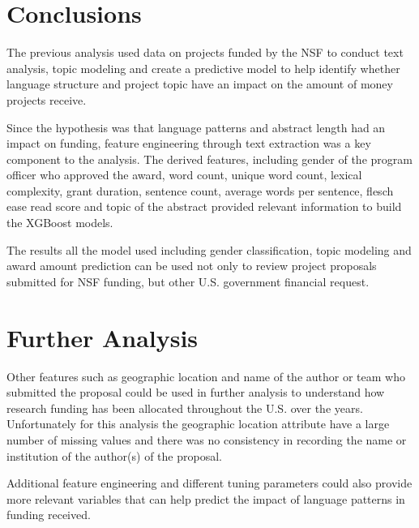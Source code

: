 \documentclass[11pt, oneside]{article}   	%
\begin{document}
 \section{Conclusions} 
 
The previous analysis used data on projects funded by the NSF to conduct text analysis, topic modeling and create a predictive model to help identify whether language structure and project topic have an impact on the amount of money projects receive.

Since the hypothesis was that language patterns and abstract length had an impact on funding, feature engineering through text extraction was a key component to the analysis. The derived features, including gender of the program officer who approved the award, word count, unique word count, lexical complexity, grant duration, sentence count, average words per sentence, flesch ease read score and topic of the abstract provided relevant information to build the XGBoost models.

The results all the model used including gender classification, topic modeling and award amount prediction can be used not only to review project proposals submitted for NSF funding, but other U.S. government financial request.

 \section{Further Analysis}

Other features such as geographic location and name of the author or team who submitted the proposal could be used in further analysis to understand how research funding has been allocated throughout the U.S. over the years. Unfortunately for this analysis the geographic location attribute have a large number of missing values and there was no consistency in recording the name or institution of the author(s) of the proposal.

Additional feature engineering and different tuning parameters could also provide more relevant variables that can help predict the impact of language patterns in funding received.
\end{document}
